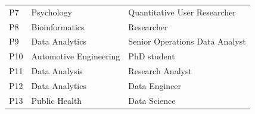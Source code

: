 {\begin{table}[ht]
\begin{tabular}{l|l|l}
            P7 & Psychology & Quantitative User Researcher \\ %
            P8 & Bioinformatics  & Researcher  \\ %
            P9 & Data Analytics & Senior Operations Data Analyst \\ %
            P10 & Automotive Engineering & PhD student \\ %
            P11 & Data Analysis & Research Analyst \\ %
            P12 & Data Analytics & Data Engineer \\ %
            P13 & Public Health & Data Science \\ %
        \end{tabular}
    \label{tab:summativeEvaluationParticipants}
  \end{table}
}

